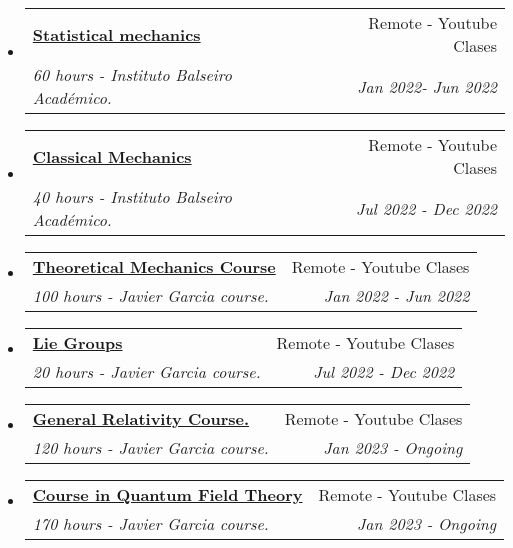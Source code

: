 \documentclass[a4paper,20pt]{article}
\makeatletter
\newcommand{\resumeSubheading}[4]{
  \vspace{-1pt}\item
    \begin{tabular*}{0.97\textwidth}{l@{\extracolsep{\fill}}r}
      \textbf{#1} & #2 \\
      \textit{#3} & \textit{#4} \\
    \end{tabular*}\vspace{-5pt}
}
\newcommand{\resumeSubHeadingListStart}{\begin{itemize}[leftmargin=*]}
\newcommand{\resumeSubHeadingListEnd}{\end{itemize}}
\makeatother
\begin{document}
  \resumeSubHeadingListStart
	\resumeSubheading
    {\href{https://www.youtube.com/playlist?list=PLv0-vSkgrxj-5sd5SmNX3h4ZgqGw5xmTl}{Statistical mechanics\faExternalLink }}{\faYoutubePlay \hspace{1mm}Remote - Youtube Clases}
    {60 hours - Instituto Balseiro Académico.}{Jan 2022- Jun 2022}
\vspace{-5pt}
	\resumeSubheading
    { \href{https://www.youtube.com/playlist?list=PLa3XiTHKTnPsTbKP-QKO1AqzeVS1gnK3n}{Classical Mechanics \faExternalLink }}{\faYoutubePlay \hspace{1mm}Remote - Youtube Clases}
    {40 hours - Instituto Balseiro Académico.}{Jul 2022 - Dec 2022}
\vspace{-5pt}
	\resumeSubheading
    {\href{https://www.youtube.com/playlist?list=PLAnA8FVrBl8C-2TTrbArT1g04RJEckRMG}{Theoretical Mechanics Course
 \faExternalLink }}{\faYoutubePlay \hspace{1mm}Remote - Youtube Clases}
    {100 hours - Javier Garcia course.}{Jan 2022 - Jun 2022}
\vspace{-5pt}
	\resumeSubheading
    {\href{https://www.youtube.com/playlist?list=PLAnA8FVrBl8DTFTMP8kXbDnRJHQKqfjaw}{Lie Groups
 \faExternalLink }}{\faYoutubePlay \hspace{1mm}Remote - Youtube Clases}
    {20 hours - Javier Garcia course.}{Jul 2022 - Dec 2022}
\vspace{-5pt}
	\resumeSubheading
    {\href{https://www.youtube.com/playlist?list=PLAnA8FVrBl8DF03y6o-AIYPLK12F1IA25}{General Relativity Course.
 \faExternalLink }}{\faYoutubePlay \hspace{1mm}Remote - Youtube Clases}
    {120 hours - Javier Garcia course.}{Jan 2023 - Ongoing}
\vspace{-5pt}
	\resumeSubheading
    {\href{https://www.youtube.com/playlist?list=PLAnA8FVrBl8BiQd_Fg-Jr32P_v9F8vG-2}{Course in Quantum Field Theory
 \faExternalLink }}{\faYoutubePlay \hspace{1mm}Remote - Youtube Clases}
    {170 hours - Javier Garcia course.}{Jan 2023 - Ongoing}
\vspace{-5pt}
\resumeSubHeadingListEnd
\end{document}
